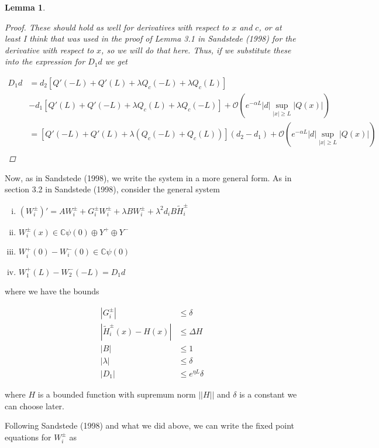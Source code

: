 \documentclass[12pt]{article}
\def\C{{\mathbb C}}
\newtheorem{lemma}{Lemma}
\begin{document}
\begin{lemma}
\begin{proof}
These should hold as well for derivatives with respect to $x$ and $c$, or at least I think that was used in the proof of Lemma 3.1 in Sandstede (1998) for the derivative with respect to $x$, so we will do that here. Thus, if we substitute these into the expression for $D_1 d$ we get

\begin{align*}
D_1 d &= d_2 [Q'(-L) + Q'(L) + \lambda Q_c(-L) + \lambda Q_c(L)] \\
&- d_1 [Q'(L) + Q'(-L) + \lambda Q_c(L) + \lambda  Q_c(-L)] + \mathcal{O}\left(e^{-\alpha L} |d| \sup_{|x| \geq L} |Q(x)| \right) \\
&= [Q'(-L) + Q'(L) + \lambda(Q_c(-L) + Q_c(L))](d_2 - d_1) + \mathcal{O}\left(e^{-\alpha L} |d| \sup_{|x| \geq L} |Q(x)| \right) \\
\end{align*}

\end{proof}
\end{lemma}

Now, as in Sandstede (1998), we write the system in a more general form. As in section 3.2 in Sandstede (1998), consider the general system

\begin{enumerate}[(i)]
\item $(W_i^\pm)' = A W_i^\pm + G_i^\pm W_i^\pm + \lambda B W_i^\pm + \lambda^2 d_i B \tilde{H}_i^\pm$
\item $W_i^\pm(x) \in \C \psi(0) \oplus Y^+ \oplus Y^-$
\item $W_i^+(0) - W_i^-(0) \in \C \psi(0) $
\item $W_1^+(L) - W_2^-(-L) = D_1 d $
\end{enumerate}

where we have the bounds 

\begin{align*}
|G_i^\pm| & \leq \delta \\
|\tilde{H}_i^\pm(x) - H(x)| &\leq \Delta H\\
|B| &\leq 1 \\
|\lambda| &\leq \delta \\
|D_1| &\leq e^{\eta L} \delta
\end{align*}

where $H$ is a bounded function with supremum norm $||H||$ and $\delta$ is a constant we can choose later.

Following Sandstede (1998) and what we did above, we can write the fixed point equations for $W_i^\pm$ as
\end{document}
